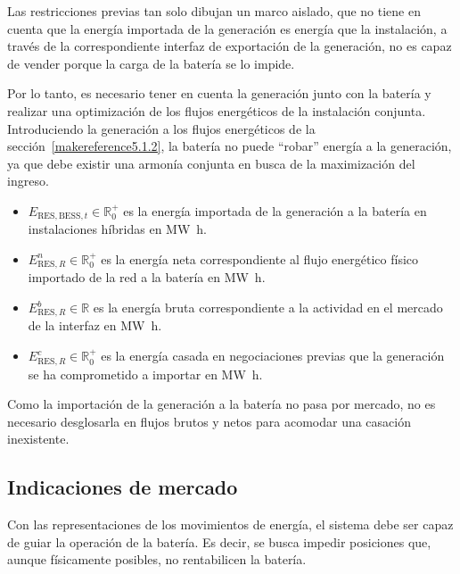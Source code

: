 Las restricciones previas tan solo dibujan un marco aislado, que no tiene en cuenta que la energía importada de la generación es energía que la instalación, a través de la correspondiente interfaz de exportación de la generación, no es capaz de vender porque la carga de la batería se lo impide.

Por lo tanto, es necesario tener en cuenta la generación junto con la batería y realizar una optimización de los flujos energéticos de la instalación conjunta. Introduciendo la generación a los flujos energéticos de la sección~\ref{makereference5.1.2}, la batería no puede ``robar'' energía a la generación, ya que debe existir una armonía conjunta en busca de la maximización del ingreso.

\begin{itemize}

  \item \( E_{\text{RES}, \text{BESS}, t} \in \mathbb{R}^{+}_{0} \) es la energía importada de la generación a la batería en instalaciones híbridas en \si{{\mega\watt\hour}}.

  \item \( E^{n}_{\text{RES}, R} \in \mathbb{R}^{+}_{0} \) es la energía neta correspondiente al flujo energético físico importado de la red a la batería en \si{{\mega\watt\hour}}.

  \item \( E^{b}_{\text{RES}, R} \in \mathbb{R} \) es la energía bruta correspondiente a la actividad en el mercado de la interfaz en \si{{\mega\watt\hour}}.

  \item \( E^{c}_{\text{RES}, R} \in \mathbb{R}^{+}_{0} \) es la energía casada en negociaciones previas que la generación se ha comprometido a importar en \si{{\mega\watt\hour}}.

\end{itemize}

Como la importación de la generación a la batería no pasa por mercado, no es necesario desglosarla en flujos brutos y netos para acomodar una casación inexistente.

\subsection{Indicaciones de mercado}%
\label{makereference5.1.4}

Con las representaciones de los movimientos de energía, el sistema debe ser capaz de guiar la operación de la batería. Es decir, se busca impedir posiciones que, aunque físicamente posibles, no rentabilicen la batería.

